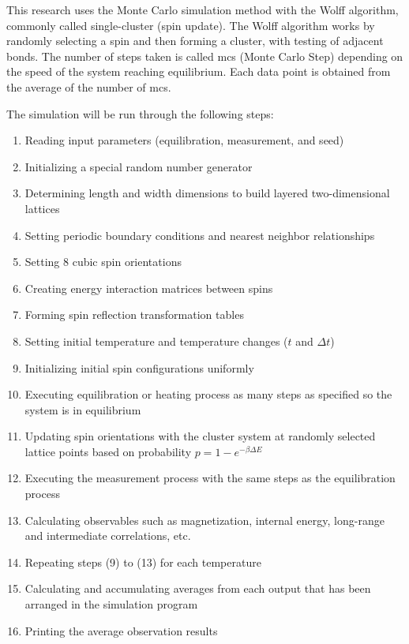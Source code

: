 This research uses the Monte Carlo simulation method with the Wolff algorithm, commonly called single-cluster (spin update). The Wolff algorithm works by randomly selecting a spin and then forming a cluster, with testing of adjacent bonds. The number of steps taken is called mcs (Monte Carlo Step) depending on the speed of the system reaching equilibrium. Each data point is obtained from the average of the number of mcs.

The simulation will be run through the following steps:
\begin{enumerate}
\item Reading input parameters (equilibration, measurement, and seed)
\item Initializing a special random number generator
\item Determining length and width dimensions to build layered two-dimensional lattices
\item Setting periodic boundary conditions and nearest neighbor relationships
\item Setting 8 cubic spin orientations
\item Creating energy interaction matrices between spins
\item Forming spin reflection transformation tables
\item Setting initial temperature and temperature changes ($t$ and $\Delta t$)
\item Initializing initial spin configurations uniformly
\item Executing equilibration or heating process as many steps as specified so the system is in equilibrium
\item Updating spin orientations with the cluster system at randomly selected lattice points based on probability $p = 1 - e^{-\beta \Delta E}$
\item Executing the measurement process with the same steps as the equilibration process
\item Calculating observables such as magnetization, internal energy, long-range and intermediate correlations, etc.
\item Repeating steps (9) to (13) for each temperature
\item Calculating and accumulating averages from each output that has been arranged in the simulation program
\item Printing the average observation results
\end{enumerate} 